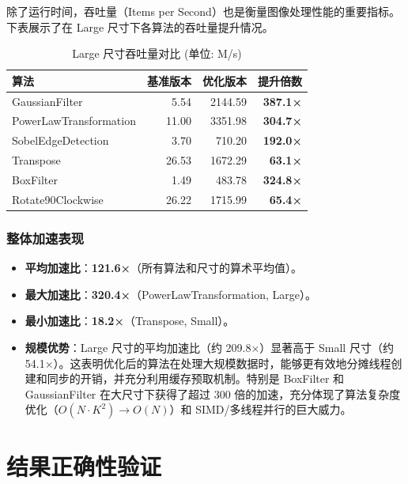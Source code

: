 \documentclass[a4paper]{article}
\begin{document}
除了运行时间，吞吐量（Items per Second）也是衡量图像处理性能的重要指标。下表展示了在 Large 尺寸下各算法的吞吐量提升情况。

\begin{tcolorbox}[colback=yellow!10!white, colframe=NavyBlue, title=Large 尺寸吞吐量对比 (单位: M/s), sharp corners, boxrule=0.8pt]
\begin{table}[H]
\centering
\caption{Large 尺寸吞吐量对比 (单位: M/s)}
\label{tab:performance_throughput}
\begin{tabular}{@{}l|rrr@{}}
\toprule
\textbf{算法} & \textbf{基准版本} & \textbf{优化版本} & \textbf{提升倍数} \\ \midrule
GaussianFilter & 5.54 & 2144.59 & \textbf{387.1×} \\
PowerLawTransformation & 11.00 & 3351.98 & \textbf{304.7×} \\
SobelEdgeDetection & 3.70 & 710.20 & \textbf{192.0×} \\
Transpose & 26.53 & 1672.29 & \textbf{63.1×} \\
BoxFilter & 1.49 & 483.78 & \textbf{324.8×} \\
Rotate90Clockwise & 26.22 & 1715.99 & \textbf{65.4×} \\ \bottomrule
\end{tabular}
\end{table}
\end{tcolorbox}

\subsubsection{整体加速表现}
\begin{itemize}
    \item \textbf{平均加速比}：\textbf{121.6×}（所有算法和尺寸的算术平均值）。
    \item \textbf{最大加速比}：\textbf{320.4×}（PowerLawTransformation, Large）。
    \item \textbf{最小加速比}：\textbf{18.2×}（Transpose, Small）。
    \item \textbf{规模优势}：Large 尺寸的平均加速比（约 209.8×）显著高于 Small 尺寸（约 54.1×）。这表明优化后的算法在处理大规模数据时，能够更有效地分摊线程创建和同步的开销，并充分利用缓存预取机制。特别是 BoxFilter 和 GaussianFilter 在大尺寸下获得了超过 300 倍的加速，充分体现了算法复杂度优化（$O(N \cdot K^2) \to O(N)$）和 SIMD/多线程并行的巨大威力。
\end{itemize}

\section{结果正确性验证}
\end{document}
